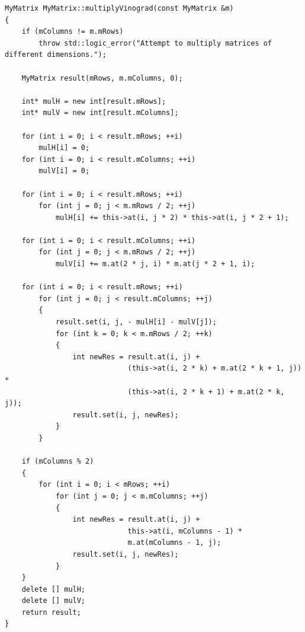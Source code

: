 \documentclass[a4paper,14pt]{report}
\begin{document}
\begin{lstlisting}[label=some-code,caption=Алгоритм Винограда]
MyMatrix MyMatrix::multiplyVinograd(const MyMatrix &m)
{
    if (mColumns != m.mRows)
        throw std::logic_error("Attempt to multiply matrices of different dimensions.");

    MyMatrix result(mRows, m.mColumns, 0);

    int* mulH = new int[result.mRows];
    int* mulV = new int[result.mColumns];

    for (int i = 0; i < result.mRows; ++i)
        mulH[i] = 0;
    for (int i = 0; i < result.mColumns; ++i)
        mulV[i] = 0;

    for (int i = 0; i < result.mRows; ++i)
        for (int j = 0; j < m.mRows / 2; ++j)
            mulH[i] += this->at(i, j * 2) * this->at(i, j * 2 + 1);

    for (int i = 0; i < result.mColumns; ++i)
        for (int j = 0; j < m.mRows / 2; ++j)
            mulV[i] += m.at(2 * j, i) * m.at(j * 2 + 1, i);

    for (int i = 0; i < result.mRows; ++i)
        for (int j = 0; j < result.mColumns; ++j)
        {
            result.set(i, j, - mulH[i] - mulV[j]);
            for (int k = 0; k < m.mRows / 2; ++k)
            {
                int newRes = result.at(i, j) +
                             (this->at(i, 2 * k) + m.at(2 * k + 1, j)) *
                             (this->at(i, 2 * k + 1) + m.at(2 * k, j));
                result.set(i, j, newRes);
            }
        }

    if (mColumns % 2)
    {
        for (int i = 0; i < mRows; ++i)
            for (int j = 0; j < m.mColumns; ++j)
            {
                int newRes = result.at(i, j) +
                             this->at(i, mColumns - 1) *
                             m.at(mColumns - 1, j);
                result.set(i, j, newRes);
            }
    }
    delete [] mulH;
    delete [] mulV;
    return result;
}
\end{lstlisting}
\end{document}
